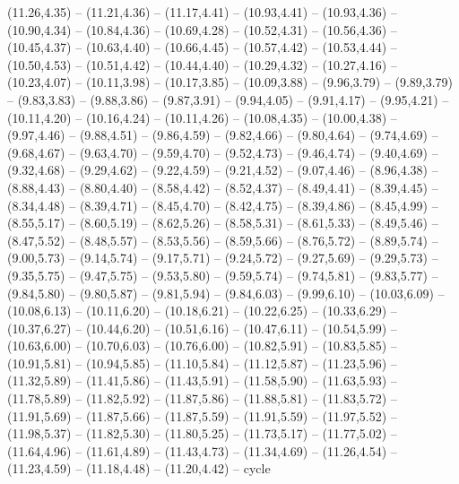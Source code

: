 \expandafter\def\csname geo:gebiet:UKR\endcsname{
  (11.26,4.35) -- (11.21,4.36) -- (11.17,4.41) -- (10.93,4.41) -- (10.93,4.36) -- (10.90,4.34) -- (10.84,4.36) -- (10.69,4.28) -- (10.52,4.31) -- (10.56,4.36) -- (10.45,4.37) -- (10.63,4.40) -- (10.66,4.45) -- (10.57,4.42) -- (10.53,4.44) -- (10.50,4.53) -- (10.51,4.42) -- (10.44,4.40) -- (10.29,4.32) -- (10.27,4.16) -- (10.23,4.07) -- (10.11,3.98) -- (10.17,3.85) -- (10.09,3.88) -- (9.96,3.79) -- (9.89,3.79) -- (9.83,3.83) -- (9.88,3.86) -- (9.87,3.91) -- (9.94,4.05) -- (9.91,4.17) -- (9.95,4.21) -- (10.11,4.20) -- (10.16,4.24) -- (10.11,4.26) -- (10.08,4.35) -- (10.00,4.38) -- (9.97,4.46) -- (9.88,4.51) -- (9.86,4.59) -- (9.82,4.66) -- (9.80,4.64) -- (9.74,4.69) -- (9.68,4.67) -- (9.63,4.70) -- (9.59,4.70) -- (9.52,4.73) -- (9.46,4.74) -- (9.40,4.69) -- (9.32,4.68) -- (9.29,4.62) -- (9.22,4.59) -- (9.21,4.52) -- (9.07,4.46) -- (8.96,4.38) -- (8.88,4.43) -- (8.80,4.40) -- (8.58,4.42) -- (8.52,4.37) -- (8.49,4.41) -- (8.39,4.45) -- (8.34,4.48) -- (8.39,4.71) -- (8.45,4.70) -- (8.42,4.75) -- (8.39,4.86) -- (8.45,4.99) -- (8.55,5.17) -- (8.60,5.19) -- (8.62,5.26) -- (8.58,5.31) -- (8.61,5.33) -- (8.49,5.46) -- (8.47,5.52) -- (8.48,5.57) -- (8.53,5.56) -- (8.59,5.66) -- (8.76,5.72) -- (8.89,5.74) -- (9.00,5.73) -- (9.14,5.74) -- (9.17,5.71) -- (9.24,5.72) -- (9.27,5.69) -- (9.29,5.73) -- (9.35,5.75) -- (9.47,5.75) -- (9.53,5.80) -- (9.59,5.74) -- (9.74,5.81) -- (9.83,5.77) -- (9.84,5.80) -- (9.80,5.87) -- (9.81,5.94) -- (9.84,6.03) -- (9.99,6.10) -- (10.03,6.09) -- (10.08,6.13) -- (10.11,6.20) -- (10.18,6.21) -- (10.22,6.25) -- (10.33,6.29) -- (10.37,6.27) -- (10.44,6.20) -- (10.51,6.16) -- (10.47,6.11) -- (10.54,5.99) -- (10.63,6.00) -- (10.70,6.03) -- (10.76,6.00) -- (10.82,5.91) -- (10.83,5.85) -- (10.91,5.81) -- (10.94,5.85) -- (11.10,5.84) -- (11.12,5.87) -- (11.23,5.96) -- (11.32,5.89) -- (11.41,5.86) -- (11.43,5.91) -- (11.58,5.90) -- (11.63,5.93) -- (11.78,5.89) -- (11.82,5.92) -- (11.87,5.86) -- (11.88,5.81) -- (11.83,5.72) -- (11.91,5.69) -- (11.87,5.66) -- (11.87,5.59) -- (11.91,5.59) -- (11.97,5.52) -- (11.98,5.37) -- (11.82,5.30) -- (11.80,5.25) -- (11.73,5.17) -- (11.77,5.02) -- (11.64,4.96) -- (11.61,4.89) -- (11.43,4.73) -- (11.34,4.69) -- (11.26,4.54) -- (11.23,4.59) -- (11.18,4.48) -- (11.20,4.42) -- cycle}
